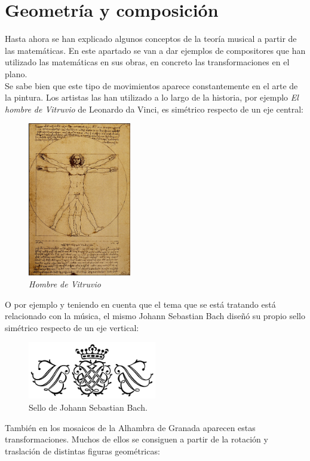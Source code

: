 \documentclass[a4paper, openright, 11pt, titlepage]{report}
\theoremstyle{definition}\newtheorem{defin}[propo]{Definition}
\theoremstyle{definition}\newtheorem{obser}[propo]{Remark}
\theoremstyle{definition}\newtheorem{ejem}[propo]{Ejemplo}
\theoremstyle{definition}\newtheorem{algoritmo}[propo]{Algoritmo}
\begin{document}
\section{Geometría y composición}
Hasta ahora se han explicado algunos conceptos de la teoría musical a partir de las matemáticas. En este apartado se van a dar ejemplos de compositores que han utilizado las matemáticas en sus obras, en concreto las transformaciones en el plano.\\ Se sabe bien que este tipo de movimientos aparece constantemente en el arte de la pintura. Los artistas las han utilizado a lo largo de la historia, por ejemplo \textit{El hombre de Vitruvio} de Leonardo da Vinci, es simétrico respecto de un eje central:
\begin{figure}[H]
    \centering
    \includegraphics[width = 0.4\textwidth]{davinci.png}
    \caption{\textit{Hombre de Vitruvio}}
\end{figure}
O por ejemplo y teniendo en cuenta que el tema que se está tratando está relacionado con la música, el mismo Johann Sebastian Bach diseñó su propio sello simétrico respecto de un eje vertical: 
\begin{figure}[H]
    \centering
    \includegraphics[width = 0.5\textwidth]{selloBach.png}
    \caption{Sello de Johann Sebastian Bach.}
\end{figure}
También en los mosaicos de la Alhambra de Granada aparecen estas transformaciones. Muchos de ellos se consiguen a partir de la rotación y traslación de distintas figuras geométricas:
\end{document}
